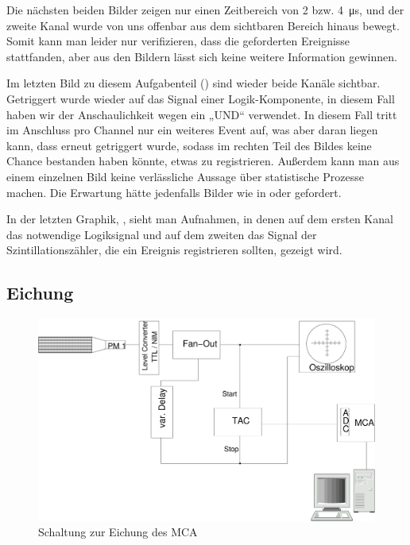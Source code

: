 Die nächsten beiden Bilder zeigen nur einen Zeitbereich von 2 bzw.
\SI{4}{\micro\second}, und der zweite Kanal wurde von uns offenbar aus dem
sichtbaren Bereich hinaus bewegt. Somit kann man leider nur verifizieren, dass
die geforderten Ereignisse stattfanden, aber aus den Bildern lässt sich keine
weitere Information gewinnen. 

Im letzten Bild zu diesem Aufgabenteil () sind wieder beide
Kanäle sichtbar. Getriggert wurde wieder auf das Signal einer Logik-Komponente,
in diesem Fall haben wir der Anschaulichkeit wegen ein „UND“ verwendet. In
diesem Fall tritt im Anschluss pro Channel nur ein weiteres Event auf, was aber
daran liegen kann, dass erneut getriggert wurde, sodass im rechten Teil des
Bildes keine Chance bestanden haben könnte, etwas zu registrieren. Außerdem
kann man aus einem einzelnen Bild keine verlässliche Aussage über statistische
Prozesse machen. Die Erwartung hätte jedenfalls Bilder wie in
 oder  gefordert.

In der letzten Graphik, , sieht man Aufnahmen, in denen auf
dem ersten Kanal das notwendige Logiksignal und auf dem zweiten das Signal der
Szintillationszähler, die ein Ereignis registrieren sollten, gezeigt wird.


\subsection{Eichung}

\begin{figure}[ht!]
  \centering
  \includegraphics[width=\columnwidth,keepaspectratio=true]{zeit_schaltung}
  \caption{Schaltung zur Eichung des MCA}
  \label{fig:zeit_schaltung}
\end{figure}


